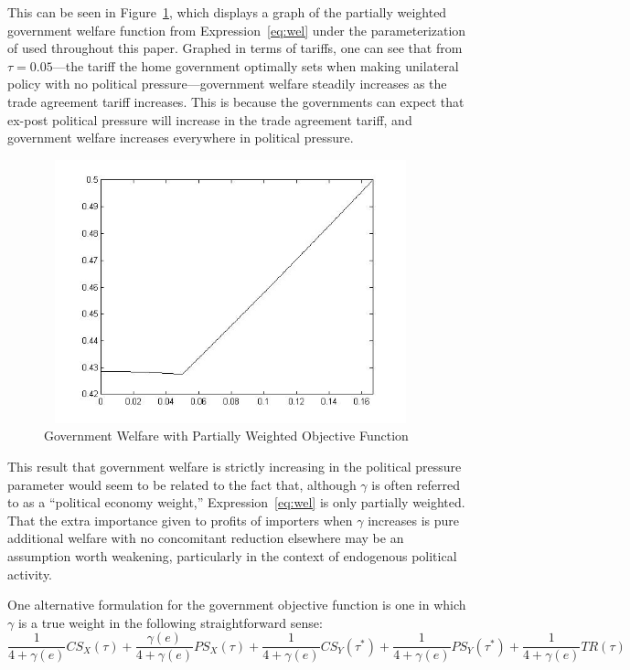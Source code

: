 \documentclass[12pt]{article}
\newcommand{\ga}{\gamma}
\begin{document}
This can be seen in Figure~\ref{fig:unweight}, which displays a graph of the partially weighted government welfare function from Expression~\ref{eq:wel} under the parameterization of \Textcite{bs2005} used throughout this paper. Graphed in terms of tariffs, one can see that from $\tau=0.05$---the tariff the home government optimally sets when making unilateral policy with no political pressure---government welfare steadily increases as the trade agreement tariff increases. This is because the governments can expect that ex-post political pressure will increase in the trade agreement tariff, and government welfare increases everywhere in political pressure.

\begin{figure}
\begin{center}
\includegraphics[height=3in, width=4.25in]{unweight.jpg}
\end{center}
\caption{Government Welfare with Partially Weighted Objective Function \label{fig:unweight}}
\end{figure}

This result that government welfare is strictly increasing in the political pressure parameter would seem to be related to the fact that, although $\ga$ is often referred to as a ``political economy weight,'' Expression~\ref{eq:wel} is only partially weighted. That the extra importance given to profits of importers when $\ga$ increases is pure additional welfare with no concomitant reduction elsewhere may be an assumption worth weakening, particularly in the context of endogenous political activity. 

One alternative formulation for the government objective function is one in which $\ga$ is a true weight in the following straightforward sense:
\begin{equation}
  \frac{1}{4+\ga(e)}CS_X(\tau) + \frac{\ga(e)}{4+\ga(e)}PS_X(\tau) + \frac{1}{4+\ga(e)}CS_Y(\tau^*) + \frac{1}{4+\ga(e)}PS_Y(\tau^*) + \frac{1}{4+\ga(e)}TR(\tau)
  \label{eq:weighted}
\end{equation}
\end{document}
